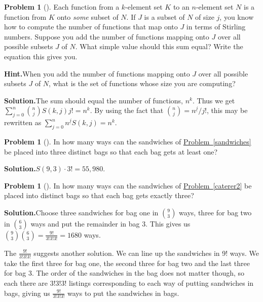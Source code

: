 \documentclass[10pt,]{book}
\theoremstyle{plain}
\theoremstyle{definition}
\newtheorem{activity}[project]{Problem}
\theoremstyle{definition}
\numberwithin{equation}{chapter}
\begin{document}
\begin{activity}[]\label{Stirlingfalling}
Each function from a \(k\)-element set \(K\) to an \(n\)-element set \(N\) is a function from \(K\) onto \emph{some} subset of \(N\). If \(J\) is a subset of \(N\) of size \(j\), you know how to compute the number of functions that map onto \(J\) in terms of Stirling numbers. Suppose you add the number of functions mapping onto \(J\) over all possible subsets \(J\) of \(N\). What simple value should this sum equal? Write the equation this gives you.%
\par\medskip\noindent%
\textbf{Hint.}\quad When you add the number of functions mapping onto \(J\) over all possible subsets \(J\) of \(N\), what is the set of functions whose size you are computing?%
\par\medskip\noindent%
\textbf{Solution.}\quad The sum should equal the number of functions, \(n^k\). Thus we get \(\sum_{j=0}^n \binom{n}{j}S(k,j)j! = n^k\). By using the fact that \(\binom{n}{j}= n^{\underline{j}}/j!\), this may be rewritten as \(\sum_{j=0}^n n^{\underline{j}}S(k,j) = n^k.\)%
\end{activity}
\begin{activity}[]\label{activity-146}
In how many ways can the sandwiches of \hyperref[sandwiches]{Problem~\ref{sandwiches}} be placed into three distinct bags so that each bag gets at least one?%
\par\medskip\noindent%
\textbf{Solution.}\quad \(S(9,3)\cdot3!= 55,980\).%
\end{activity}
\begin{activity}[]\label{activity-147}
In how many ways can the sandwiches of \hyperref[caterer2]{Problem~\ref{caterer2}} be placed into distinct bags so that each bag gets exactly three?%
\par\medskip\noindent%
\textbf{Solution.}\quad Choose three sandwiches for bag one in \(\binom{9}{3}\) ways, three for bag two in \(\binom{6}{3}\) ways and put the remainder in bag 3.  This gives us \(\binom{9}{3}\binom{6}{3}=\frac{9!}{3!3!3!}=1680\) ways.%
\par
The \(\frac{9!}{3!3!3!}\) suggests another solution. We can line up the sandwiches in 9! ways. We take the first three for bag one, the second three for bag two and the last three for bag 3. The order of the sandwiches in the bag does not matter though, so each there are \(3!3!3!\) listings corresponding to each way of putting sandwiches in bags, giving us \(\frac{9!}{3!3!3!}\) ways to put the sandwiches in bags.%
\end{activity}
\end{document}
